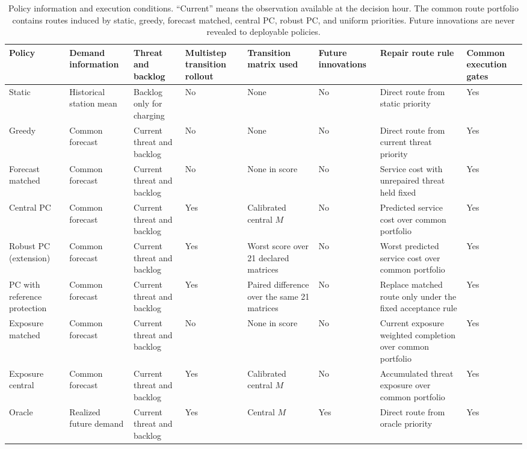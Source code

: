 \documentclass[journal]{IEEEtran}
\newcommand{\DIFnewtablecolor}{\color{blue}}
\begin{document}
\begin{table}[t]\DIFnewtablecolor
\centering
\caption{Policy information and execution conditions.  ``Current'' means the
observation available at the decision hour.  The common route portfolio contains
routes induced by static, greedy, forecast matched, central PC, robust PC, and
uniform priorities.  Future innovations are never revealed to deployable
policies.}
\label{tab:policy-definitions}
\scriptsize
\setlength{\tabcolsep}{2.4pt}
\begin{tabular}{p{}p{}p{}p{}p{}p{}p{}p{}}
\toprule
Policy & Demand information & Threat and backlog & Multistep transition rollout & Transition matrix used & Future innovations & Repair route rule & Common execution gates \\
\midrule
Static & Historical station mean & Backlog only for charging & No & None & No & Direct route from static priority & Yes \\
Greedy & Common forecast & Current threat and backlog & No & None & No & Direct route from current threat priority & Yes \\
Forecast matched & Common forecast & Current threat and backlog & No & None in score & No & Service cost with unrepaired threat held fixed & Yes \\
Central PC & Common forecast & Current threat and backlog & Yes & Calibrated central $M$ & No & Predicted service cost over common portfolio & Yes \\
Robust PC (extension) & Common forecast & Current threat and backlog & Yes & Worst score over 21 declared matrices & No & Worst predicted service cost over common portfolio & Yes \\
PC with reference protection & Common forecast & Current threat and backlog & Yes & Paired difference over the same 21 matrices & No & Replace matched route only under the fixed acceptance rule & Yes \\
Exposure matched & Common forecast & Current threat and backlog & No & None in score & No & Current exposure weighted completion over common portfolio & Yes \\
Exposure central & Common forecast & Current threat and backlog & Yes & Calibrated central $M$ & No & Accumulated threat exposure over common portfolio & Yes \\
Oracle & Realized future demand & Current threat and backlog & Yes & Central $M$ & Yes & Direct route from oracle priority & Yes \\
\bottomrule
\end{tabular}
\end{table}
\end{document}
